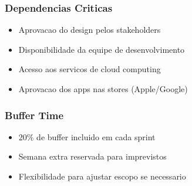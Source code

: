 \subsubsection{Dependencias Criticas}
\begin{itemize}
    \item Aprovacao do design pelos stakeholders
    \item Disponibilidade da equipe de desenvolvimento
    \item Acesso aos servicos de cloud computing
    \item Aprovacao dos apps nas stores (Apple/Google)
\end{itemize}

\subsubsection{Buffer Time}
\begin{itemize}
    \item 20\% de buffer incluido em cada sprint
    \item Semana extra reservada para imprevistos
    \item Flexibilidade para ajustar escopo se necessario
\end{itemize}
